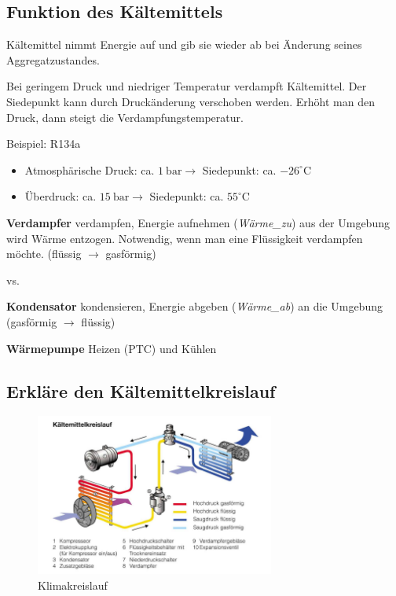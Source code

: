 \subsection{Funktion des
Kältemittels}\label{funktion-des-kaeltemittels}

Kältemittel nimmt Energie auf und gib sie wieder ab bei Änderung seines
Aggregatzustandes.

Bei geringem Druck und niedriger Temperatur verdampft Kältemittel. Der
Siedepunkt kann durch Druckänderung verschoben werden. Erhöht man den
Druck, dann steigt die Verdampfungstemperatur.

Beispiel: R134a

\begin{itemize}
\item
  Atmosphärische Druck: ca. $1~\text{bar} \to$ Siedepunkt: ca.
  $-26^\circ \text{C}$
\item
  Überdruck: ca. $15~\text{bar} \to$ Siedepunkt: ca.
  $55^\circ \text{C}$
\end{itemize}

\textbf{Verdampfer} verdampfen, Energie aufnehmen (\emph{Wärme\_zu}) aus
der Umgebung wird Wärme entzogen. Notwendig, wenn man eine Flüssigkeit
verdampfen möchte. (flüssig $\to$ gasförmig)

vs.

\textbf{Kondensator} kondensieren, Energie abgeben (\emph{Wärme\_ab}) an
die Umgebung (gasförmig $\to$ flüssig)

\textbf{Wärmepumpe} Heizen (PTC) und Kühlen

\newpage

\subsection{Erkläre den
Kältemittelkreislauf}\label{erklaere-den-kaeltemittelkreislauf}

\begin{figure}[!ht]%
\centering
\includegraphics[width=0.7\textwidth]{images/Klima/Klimakreislauf-1.pdf}
\caption{Klimakreislauf}
\end{figure}

